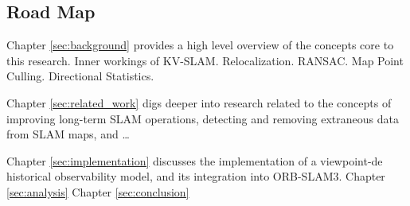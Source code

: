 \subsection{Road Map}

Chapter \ref{sec:background} provides a high level overview of the concepts core to this research. Inner workings of KV-SLAM. Relocalization. RANSAC. Map Point Culling. Directional Statistics.

Chapter \ref{sec:related_work} digs deeper into research related to the concepts of improving long-term SLAM operations, detecting and removing extraneous data from SLAM maps, and \dots

Chapter \ref{sec:implementation} discusses the implementation of a viewpoint-de historical observability model, and its integration into ORB-SLAM3. 
Chapter \ref{sec:analysis}
Chapter \ref{sec:conclusion}
